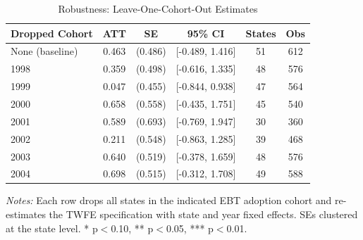 \begin{table}[H]
\centering
\caption{Robustness: Leave-One-Cohort-Out Estimates}
\label{tab:robust}
\small
\begin{threeparttable}
\begin{tabular}{lccccc}
\toprule
Dropped Cohort & ATT & SE & 95\% CI & States & Obs \\
\midrule
None (baseline) & 0.463 & (0.486) & [-0.489, 1.416] & 51 & 612 \\
\midrule
1998 & 0.359 & (0.498) & [-0.616, 1.335] & 48 & 576 \\
1999 & 0.047 & (0.455) & [-0.844, 0.938] & 47 & 564 \\
2000 & 0.658 & (0.558) & [-0.435, 1.751] & 45 & 540 \\
2001 & 0.589 & (0.693) & [-0.769, 1.947] & 30 & 360 \\
2002 & 0.211 & (0.548) & [-0.863, 1.285] & 39 & 468 \\
2003 & 0.640 & (0.519) & [-0.378, 1.659] & 48 & 576 \\
2004 & 0.698 & (0.515) & [-0.312, 1.708] & 49 & 588 \\
\bottomrule
\end{tabular}
\begin{tablenotes}[flushleft]
\footnotesize
\item \textit{Notes:} Each row drops all states in the indicated EBT adoption cohort and re-estimates the TWFE specification with state and year fixed effects. SEs clustered at the state level. * p$<$0.10, ** p$<$0.05, *** p$<$0.01.
\end{tablenotes}
\end{threeparttable}
\end{table}
